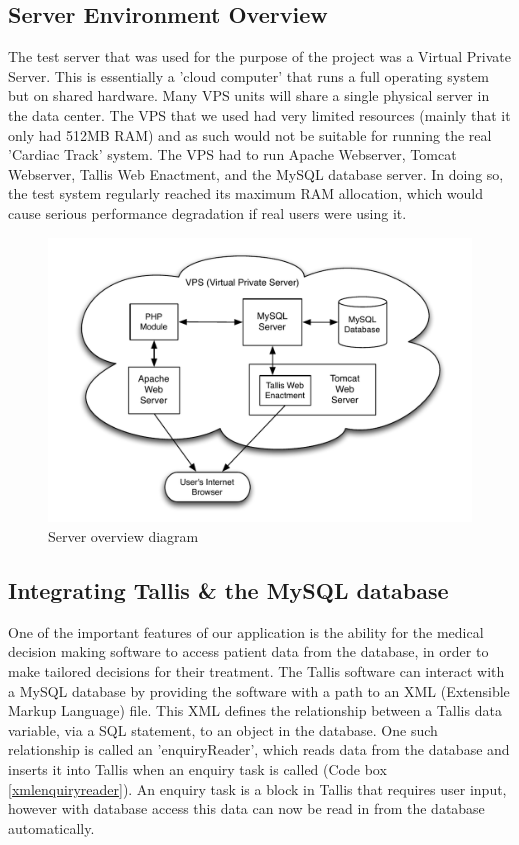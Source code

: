 \documentclass[11pt]{article}
\begin{document}
\subsection{Server Environment Overview} \label{vps}
The test server that was used for the purpose of the project was a Virtual Private Server. This is essentially a 'cloud computer' that runs a full operating system but on shared hardware. Many VPS units will share a single physical server in the data center. The VPS that we used had very limited resources (mainly that it only had 512MB RAM) and as such would not be suitable for running the real 'Cardiac Track' system. The VPS had to run Apache Webserver, Tomcat Webserver, Tallis Web Enactment, and the MySQL database server. In doing so, the test system regularly reached its maximum RAM allocation, which would cause serious performance degradation if real users were using it.

\begin{figure}[ht]
\centering
\includegraphics[scale=0.85]{server-environment-pdf-2}
\caption{Server overview diagram}
\label{server-environment}
\end{figure}


\subsection{Integrating Tallis \& the MySQL database}
One of the important features of our application is the ability for the medical decision making software to access patient data from the database, in order to make tailored decisions for their treatment. The Tallis software can interact with a MySQL database by providing the software with a path to an XML (Extensible Markup Language) file. This XML defines the relationship between a Tallis data variable, via a SQL statement, to an object in the database. One such relationship is called an 'enquiryReader', which reads data from the database and inserts it into Tallis when an enquiry task is called (Code box \ref{xmlenquiryreader}). An enquiry task is a block in Tallis that requires user input, however with database access this data can now be read in from the database automatically. 
\end{document}
